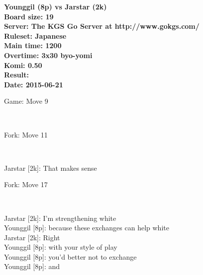 \documentclass{article}
\begin{document}
\begin{titlepage}
    \null
    \vfill
    \begin{center}
        \textbf{Younggil (8p) vs Jarstar (2k)}\\
        \textbf{Board size: 19}\\
        \textbf{Server: The KGS Go Server at http://www.gokgs.com/}\\
        \textbf{Ruleset: Japanese}\\
        \textbf{Main time: 1200}\\
        \textbf{Overtime: 3x30 byo-yomi}\\
        \textbf{Komi: 0.50}\\
        \textbf{Result: }\\
        \textbf{Date: 2015-06-21}
    \end{center}
    \vfill
\end{titlepage}
\newpage
\tableofcontents
\newpage
\begin{section}{Game: Move 9}
\begin{center}
\cleargoban
{}
\showfullgoban
\\\parbox{4.5in}{
}
\end{center}
\end{section}
\begin{subsection}{Fork: Move 11}
\begin{center}
\cleargoban
{}
\showfullgoban
\\\parbox{4.5in}{
Jarstar [2k]: That makes sense\\}
\end{center}
\end{subsection}
\begin{subsection}{Fork: Move 17}
\begin{center}
\cleargoban
{}
\showfullgoban
\\\parbox{4.5in}{
Jarstar [2k]: I'm strengthening white\\Younggil [8p]: because these exchanges can help white\\Jarstar [2k]: Right\\Younggil [8p]: with your style of play\\Younggil [8p]: you'd better not to exchange\\Younggil [8p]: and\\}
\end{center}
\end{subsection}
\end{document}
